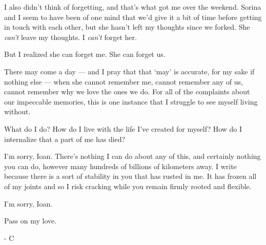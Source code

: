 I also didn't think of forgetting, and that's what got me over the weekend. Sorina and I seem to have been of one mind that we'd give it a bit of time before getting in touch with each other, but she hasn't left my thoughts since we forked. She \emph{can't} leave my thoughts. I \emph{can't} forget her.

But I realized she can forget me. She can forget us.

There may come a day — and I pray that that `may' is accurate, for my sake if nothing else — when she cannot remember me, cannot remember any of us, cannot remember why we love the ones we do. For all of the complaints about our impeccable memories, this is one instance that I struggle to see myself living without.

What do I do? How do I live with the life I've created for myself? How do I internalize that a part of me has died?

I'm sorry, Ioan. There's nothing I can do about any of this, and certainly nothing you can do, however many hundreds of billions of kilometers away. I write because there is a sort of stability in you that has rusted in me. It has frozen all of my joints and so I risk cracking while you remain firmly rooted and flexible.

I'm sorry, Ioan.

Pass on my love.

- C
